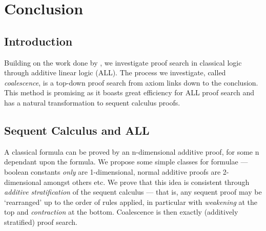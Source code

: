 \chapter{Conclusion}
    
    
    \section*{Introduction}
        Building on the work done by \citet{petri-nets}, we investigate proof search in classical logic through additive linear logic (ALL).
        The process we investigate, called \textit{coalescence}, is a top-down proof search from axiom links down to the conclusion.
        This method is promising as it boasts great efficiency for ALL proof search and has a natural transformation to sequent calculus proofs.

    \section*{Sequent Calculus and ALL}
        A classical formula can be proved by an n-dimensional additive proof, for some n dependant upon the formula.
        We propose some simple classes for formulae --- boolean constants \textit{only} are 1-dimensional, normal additive proofs are 2-dimensional amongst others etc.
        We prove that this idea is consistent through \textit{additive stratification} of the sequent calculus --- that is, any sequent proof may be `rearranged' up to the order of rules applied, in particular with \textit{weakening} at the top and \textit{contraction} at the bottom.
        Coalescence is then exactly (additively stratified) proof search.

